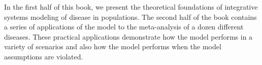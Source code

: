 In the first half of this book, we present the theoretical foundations
of integrative systems modeling of disease
in populations.  The second
half of the book contains a series of applications of the model to the
meta-analysis of a dozen different diseases.  These
practical applications demonstrate how the model performs in a variety
of scenarios and also how the model performs when the
model assumptions are violated.

